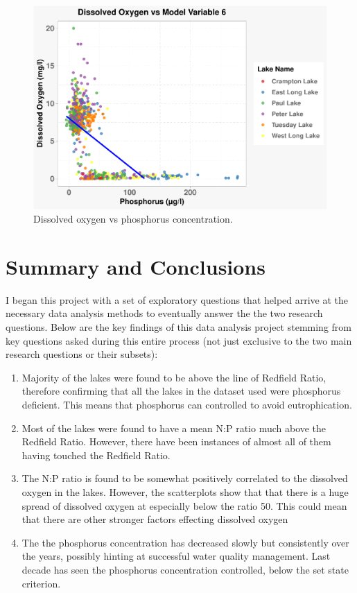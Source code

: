 \documentclass[12pt,]{article}
\begin{document}
\begin{figure}
\centering
\includegraphics{Eadala_ENV872_Project_files/figure-latex/fig14-1.pdf}
\caption{Dissolved oxygen vs phosphorus concentration.}
\end{figure}

\newpage

\hypertarget{summary-and-conclusions}{%
\section{Summary and Conclusions}\label{summary-and-conclusions}}

I began this project with a set of exploratory questions that helped
arrive at the necessary data analysis methods to eventually answer the
the two research questions. Below are the key findings of this data
analysis project stemming from key questions asked during this entire
process (not just exclusive to the two main research questions or their
subsets):

\begin{enumerate}
\def\labelenumi{\arabic{enumi}.}
\item
  Majority of the lakes were found to be above the line of Redfield
  Ratio, therefore confirming that all the lakes in the dataset used
  were phosphorus deficient. This means that phosphorus can controlled
  to avoid eutrophication.
\item
  Most of the lakes were found to have a mean N:P ratio much above the
  Redfield Ratio. However, there have been instances of almost all of
  them having touched the Redfield Ratio.
\item
  The N:P ratio is found to be somewhat positively correlated to the
  dissolved oxygen in the lakes. However, the scatterplots show that
  that there is a huge spread of dissolved oxygen at especially below
  the ratio 50. This could mean that there are other stronger factors
  effecting dissolved oxygen
\item
  The the phosphorus concentration has decreased slowly but consistently
  over the years, possibly hinting at successful water quality
  management. Last decade has seen the phosphorus concentration
  controlled, below the set state criterion.
\end{enumerate}
\end{document}
